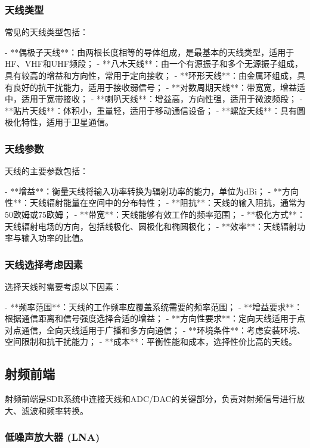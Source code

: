 ﻿\documentclass[UTF8]{ctexbook}
\begin{document}
\subsubsection{天线类型}

常见的天线类型包括：

- **偶极子天线**：由两根长度相等的导体组成，是最基本的天线类型，适用于HF、VHF和UHF频段；
- **八木天线**：由一个有源振子和多个无源振子组成，具有较高的增益和方向性，常用于定向接收；
- **环形天线**：由金属环组成，具有良好的抗干扰能力，适用于接收弱信号；
- **对数周期天线**：带宽宽，增益适中，适用于宽带接收；
- **喇叭天线**：增益高，方向性强，适用于微波频段；
- **贴片天线**：体积小，重量轻，适用于移动通信设备；
- **螺旋天线**：具有圆极化特性，适用于卫星通信。

\subsubsection{天线参数}

天线的主要参数包括：

- **增益**：衡量天线将输入功率转换为辐射功率的能力，单位为dBi；
- **方向性**：天线辐射能量在空间中的分布特性；
- **阻抗**：天线的输入阻抗，通常为50欧姆或75欧姆；
- **带宽**：天线能够有效工作的频率范围；
- **极化方式**：天线辐射电场的方向，包括线极化、圆极化和椭圆极化；
- **效率**：天线辐射功率与输入功率的比值。

\subsubsection{天线选择考虑因素}

选择天线时需要考虑以下因素：

- **频率范围**：天线的工作频率应覆盖系统需要的频率范围；
- **增益要求**：根据通信距离和信号强度选择合适的增益；
- **方向性要求**：定向天线适用于点对点通信，全向天线适用于广播和多方向通信；
- **环境条件**：考虑安装环境、空间限制和抗干扰能力；
- **成本**：平衡性能和成本，选择性价比高的天线。
\subsection{射频前端}

射频前端是SDR系统中连接天线和ADC/DAC的关键部分，负责对射频信号进行放大、滤波和频率转换。

\subsubsection{低噪声放大器 (LNA)}
\end{document}
